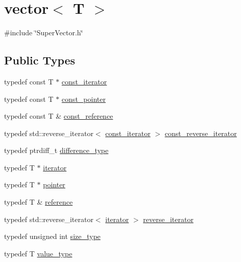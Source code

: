 \hypertarget{classvector}{}\section{vector$<$ T $>$}
\label{classvector}


{\ttfamily \#include \char`\"{}Super\+Vector.\+h\char`\"{}}

\subsection*{Public Types}
\begin{DoxyCompactItemize}
\item 
typedef const T $\ast$ \mbox{\hyperlink{classvector_a2fc97dce62b7053449cc868607540dba}{const\+\_\+iterator}}
\item 
typedef const T $\ast$ \mbox{\hyperlink{classvector_a53d259f0075b22d7646e373816830e8e}{const\+\_\+pointer}}
\item 
typedef const T \& \mbox{\hyperlink{classvector_af9ba3e25df088c62f7d535b91672cda9}{const\+\_\+reference}}
\item 
typedef std\+::reverse\+\_\+iterator$<$ \mbox{\hyperlink{classvector_a2fc97dce62b7053449cc868607540dba}{const\+\_\+iterator}} $>$ \mbox{\hyperlink{classvector_a421ef78ccdc84f0f6b2b14e2732527ba}{const\+\_\+reverse\+\_\+iterator}}
\item 
typedef ptrdiff\+\_\+t \mbox{\hyperlink{classvector_acf947bbb9e09f863cc3572ff8550b183}{difference\+\_\+type}}
\item 
typedef T $\ast$ \mbox{\hyperlink{classvector_a35c955cacac6aacaa1e82874b1628865}{iterator}}
\item 
typedef T $\ast$ \mbox{\hyperlink{classvector_a680c78d51cff3fd301666dd75bdbe49d}{pointer}}
\item 
typedef T \& \mbox{\hyperlink{classvector_a9b1a63f171d76a7a3995b6858e99f2ea}{reference}}
\item 
typedef std\+::reverse\+\_\+iterator$<$ \mbox{\hyperlink{classvector_a35c955cacac6aacaa1e82874b1628865}{iterator}} $>$ \mbox{\hyperlink{classvector_a92b881db836646f4039adcbb73c8595f}{reverse\+\_\+iterator}}
\item 
typedef unsigned int \mbox{\hyperlink{classvector_ada51e68d31936547d3729c82daf6b7c6}{size\+\_\+type}}
\item 
typedef T \mbox{\hyperlink{classvector_a265a253612b46abed17c61b0a5e5ce30}{value\+\_\+type}}
\end{DoxyCompactItemize}
